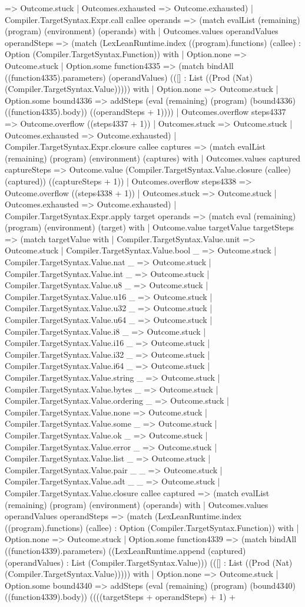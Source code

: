 \documentclass[11pt]{article}
\begin{document}
=> Outcome.stuck | Outcomes.exhausted => Outcome.exhausted) | Compiler.TargetSyntax.Expr.call callee operands => (match evalList (remaining) (program) (environment) (operands) with | Outcomes.values operandValues operandSteps => (match (LexLeanRuntime.index ((program).functions) (callee) : Option (Compiler.TargetSyntax.Function)) with | Option.none => Outcome.stuck | Option.some function4335 => (match bindAll ((function4335).parameters) (operandValues) (([] : List ((Prod (Nat) (Compiler.TargetSyntax.Value))))) with | Option.none => Outcome.stuck | Option.some bound4336 => addSteps (eval (remaining) (program) (bound4336) ((function4335).body)) ((operandSteps + 1)))) | Outcomes.overflow steps4337 => Outcome.overflow ((steps4337 + 1)) | Outcomes.stuck => Outcome.stuck | Outcomes.exhausted => Outcome.exhausted) | Compiler.TargetSyntax.Expr.closure callee captures => (match evalList (remaining) (program) (environment) (captures) with | Outcomes.values captured captureSteps => Outcome.value (Compiler.TargetSyntax.Value.closure (callee) (captured)) ((captureSteps + 1)) | Outcomes.overflow steps4338 => Outcome.overflow ((steps4338 + 1)) | Outcomes.stuck => Outcome.stuck | Outcomes.exhausted => Outcome.exhausted) | Compiler.TargetSyntax.Expr.apply target operands => (match eval (remaining) (program) (environment) (target) with | Outcome.value targetValue targetSteps => (match targetValue with | Compiler.TargetSyntax.Value.unit => Outcome.stuck | Compiler.TargetSyntax.Value.bool \_ => Outcome.stuck | Compiler.TargetSyntax.Value.nat \_ => Outcome.stuck | Compiler.TargetSyntax.Value.int \_ => Outcome.stuck | Compiler.TargetSyntax.Value.u8 \_ => Outcome.stuck | Compiler.TargetSyntax.Value.u16 \_ => Outcome.stuck | Compiler.TargetSyntax.Value.u32 \_ => Outcome.stuck | Compiler.TargetSyntax.Value.u64 \_ => Outcome.stuck | Compiler.TargetSyntax.Value.i8 \_ => Outcome.stuck | Compiler.TargetSyntax.Value.i16 \_ => Outcome.stuck | Compiler.TargetSyntax.Value.i32 \_ => Outcome.stuck | Compiler.TargetSyntax.Value.i64 \_ => Outcome.stuck | Compiler.TargetSyntax.Value.string \_ => Outcome.stuck | Compiler.TargetSyntax.Value.bytes \_ => Outcome.stuck | Compiler.TargetSyntax.Value.ordering \_ => Outcome.stuck | Compiler.TargetSyntax.Value.none => Outcome.stuck | Compiler.TargetSyntax.Value.some \_ => Outcome.stuck | Compiler.TargetSyntax.Value.ok \_ => Outcome.stuck | Compiler.TargetSyntax.Value.error \_ => Outcome.stuck | Compiler.TargetSyntax.Value.list \_ => Outcome.stuck | Compiler.TargetSyntax.Value.pair \_ \_ => Outcome.stuck | Compiler.TargetSyntax.Value.adt \_ \_ => Outcome.stuck | Compiler.TargetSyntax.Value.closure callee captured => (match evalList (remaining) (program) (environment) (operands) with | Outcomes.values operandValues operandSteps => (match (LexLeanRuntime.index ((program).functions) (callee) : Option (Compiler.TargetSyntax.Function)) with | Option.none => Outcome.stuck | Option.some function4339 => (match bindAll ((function4339).parameters) ((LexLeanRuntime.append (captured) (operandValues) : List (Compiler.TargetSyntax.Value))) (([] : List ((Prod (Nat) (Compiler.TargetSyntax.Value))))) with | Option.none => Outcome.stuck | Option.some bound4340 => addSteps (eval (remaining) (program) (bound4340) ((function4339).body)) ((((targetSteps + operandSteps) + 1) + 
\end{document}
